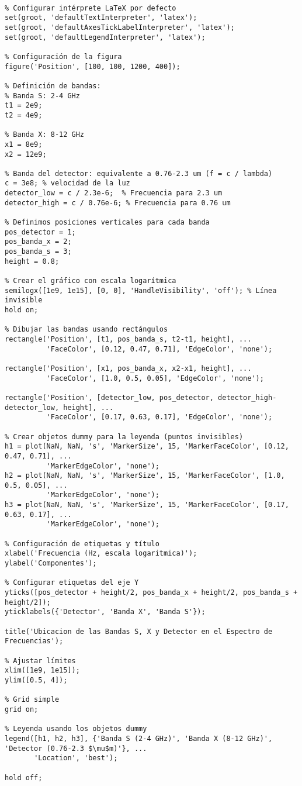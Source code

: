 \begin{verbatim}

% Configurar intérprete LaTeX por defecto
set(groot, 'defaultTextInterpreter', 'latex');
set(groot, 'defaultAxesTickLabelInterpreter', 'latex');
set(groot, 'defaultLegendInterpreter', 'latex');

% Configuración de la figura
figure('Position', [100, 100, 1200, 400]);

% Definición de bandas:
% Banda S: 2-4 GHz
t1 = 2e9;
t2 = 4e9;

% Banda X: 8-12 GHz
x1 = 8e9;
x2 = 12e9;

% Banda del detector: equivalente a 0.76-2.3 um (f = c / lambda)
c = 3e8; % velocidad de la luz
detector_low = c / 2.3e-6;  % Frecuencia para 2.3 um
detector_high = c / 0.76e-6; % Frecuencia para 0.76 um

% Definimos posiciones verticales para cada banda
pos_detector = 1;
pos_banda_x = 2;
pos_banda_s = 3;
height = 0.8;

% Crear el gráfico con escala logarítmica
semilogx([1e9, 1e15], [0, 0], 'HandleVisibility', 'off'); % Línea invisible
hold on;

% Dibujar las bandas usando rectángulos 
rectangle('Position', [t1, pos_banda_s, t2-t1, height], ...
          'FaceColor', [0.12, 0.47, 0.71], 'EdgeColor', 'none');

rectangle('Position', [x1, pos_banda_x, x2-x1, height], ...
          'FaceColor', [1.0, 0.5, 0.05], 'EdgeColor', 'none');

rectangle('Position', [detector_low, pos_detector, detector_high-detector_low, height], ...
          'FaceColor', [0.17, 0.63, 0.17], 'EdgeColor', 'none');

% Crear objetos dummy para la leyenda (puntos invisibles)
h1 = plot(NaN, NaN, 's', 'MarkerSize', 15, 'MarkerFaceColor', [0.12, 0.47, 0.71], ...
          'MarkerEdgeColor', 'none');
h2 = plot(NaN, NaN, 's', 'MarkerSize', 15, 'MarkerFaceColor', [1.0, 0.5, 0.05], ...
          'MarkerEdgeColor', 'none');
h3 = plot(NaN, NaN, 's', 'MarkerSize', 15, 'MarkerFaceColor', [0.17, 0.63, 0.17], ...
          'MarkerEdgeColor', 'none');

% Configuración de etiquetas y título
xlabel('Frecuencia (Hz, escala logaritmica)');
ylabel('Componentes');

% Configurar etiquetas del eje Y
yticks([pos_detector + height/2, pos_banda_x + height/2, pos_banda_s + height/2]);
yticklabels({'Detector', 'Banda X', 'Banda S'});

title('Ubicacion de las Bandas S, X y Detector en el Espectro de Frecuencias');

% Ajustar límites
xlim([1e9, 1e15]);
ylim([0.5, 4]);

% Grid simple
grid on;

% Leyenda usando los objetos dummy
legend([h1, h2, h3], {'Banda S (2-4 GHz)', 'Banda X (8-12 GHz)', 'Detector (0.76-2.3 $\mu$m)'}, ...
       'Location', 'best');

hold off;


\end{verbatim}
